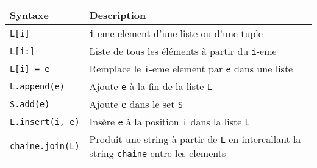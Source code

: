 \documentclass[]{article}
\begin{document}
\begin{longtable}[]{@{}ll@{}}
\toprule
\begin{minipage}[b]{0.15\columnwidth}\raggedright
Syntaxe\strut
\end{minipage} & \begin{minipage}[b]{0.79\columnwidth}\raggedright
Description\strut
\end{minipage}\tabularnewline
\midrule
\endhead
\begin{minipage}[t]{0.15\columnwidth}\raggedright
\texttt{L{[}i{]}}\strut
\end{minipage} & \begin{minipage}[t]{0.79\columnwidth}\raggedright
\texttt{i}-eme element d'une liste ou d'une tuple\strut
\end{minipage}\tabularnewline
\begin{minipage}[t]{0.15\columnwidth}\raggedright
\texttt{L{[}i:{]}}\strut
\end{minipage} & \begin{minipage}[t]{0.79\columnwidth}\raggedright
Liste de tous les éléments à partir du \texttt{i}-eme\strut
\end{minipage}\tabularnewline
\begin{minipage}[t]{0.15\columnwidth}\raggedright
\texttt{L{[}i{]}\ =\ e}\strut
\end{minipage} & \begin{minipage}[t]{0.79\columnwidth}\raggedright
Remplace le \texttt{i}-eme element par \texttt{e} dans une liste\strut
\end{minipage}\tabularnewline
\begin{minipage}[t]{0.15\columnwidth}\raggedright
\texttt{L.append(e)}\strut
\end{minipage} & \begin{minipage}[t]{0.79\columnwidth}\raggedright
Ajoute \texttt{e} à la fin de la liste \texttt{L}\strut
\end{minipage}\tabularnewline
\begin{minipage}[t]{0.15\columnwidth}\raggedright
\texttt{S.add(e)}\strut
\end{minipage} & \begin{minipage}[t]{0.79\columnwidth}\raggedright
Ajoute \texttt{e} dans le set \texttt{S}\strut
\end{minipage}\tabularnewline
\begin{minipage}[t]{0.15\columnwidth}\raggedright
\texttt{L.insert(i,\ e)}\strut
\end{minipage} & \begin{minipage}[t]{0.79\columnwidth}\raggedright
Insère \texttt{e} à la position \texttt{i} dans la liste
\texttt{L}\strut
\end{minipage}\tabularnewline
\begin{minipage}[t]{0.15\columnwidth}\raggedright
\texttt{chaine.join(L)}\strut
\end{minipage} & \begin{minipage}[t]{0.79\columnwidth}\raggedright
Produit une string à partir de \texttt{L} en intercallant la string
\texttt{chaine} entre les elements\strut
\end{minipage}\tabularnewline
\bottomrule
\end{longtable}
\end{document}
